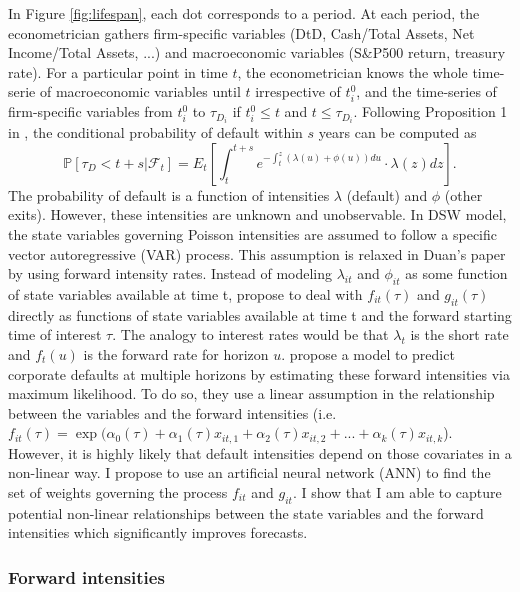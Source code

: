 In Figure \ref{fig:lifespan}, each dot corresponds to a period. At each period, the econometrician gathers firm-specific variables (DtD, Cash/Total Assets, Net Income/Total Assets, ...) and macroeconomic variables (S\&P500 return, treasury rate). For a particular point in time $t$, the econometrician knows the whole time-serie of macroeconomic variables until $t$ irrespective of $t_i^0$, and the time-series of firm-specific variables from $t_i^0$ to $\tau_{D_i}$ if $t_i^0 \leq t$ and $t \leq \tau_{D_i}$.
Following Proposition 1 in \citet{DSW}, the conditional probability of default within $s$ years can be computed as 
\begin{equation} \label{eq:3.6}
\mathbb{P}[ \tau_D <t+s |\mathscr{F}_t] = E_t \left[ \int_t^{t+s}  e^{-\int_t^z (\lambda(u)+\phi(u)) du} \cdot \lambda(z) dz \right].
\end{equation}
The probability of default is a function of intensities $\lambda$ (default) and $\phi$ (other exits). However, these intensities are unknown and unobservable. In DSW model, the state variables governing Poisson intensities are assumed to follow a specific vector autoregressive (VAR) process. This assumption is relaxed in Duan's paper by using forward intensity rates. Instead of modeling $\lambda_{it}$ and $\phi_{it}$ as some function of state variables available at time t, \citet{Duan2012} propose to deal with $f_{it}(\tau)$ and $g_{it}(\tau)$ directly as functions of state variables available at time t and the forward starting time of interest $\tau$. The analogy to interest rates would be that $\lambda_t$ is the short rate and $f_t(u)$ is the forward rate for horizon $u$. \citet{Duan2012} propose a model to predict corporate defaults at multiple horizons by estimating these forward intensities via maximum likelihood. To do so, they use a linear assumption in the relationship between the variables and the forward intensities (i.e. $f_{it}(\tau) = \exp(\alpha_0(\tau) + \alpha_1(\tau) x_{it,1} + \alpha_2(\tau) x_{it,2} + ... + \alpha_k(\tau) x_{it,k}$). However, it is highly likely that default intensities depend on those covariates in a non-linear way. I propose to use an artificial neural network (ANN) to find the set of weights governing the process $f_{it}$ and $g_{it}$. I show that I am able to capture potential non-linear relationships between the state variables and the forward intensities which significantly improves forecasts.


\subsubsection{Forward intensities}
\label{SSS:2-1-1}

